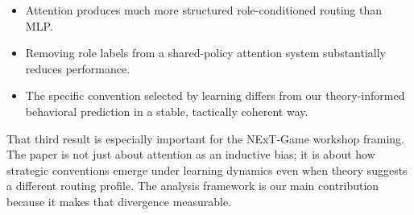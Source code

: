 \begin{itemize}
  \item Attention produces much more structured role-conditioned routing than MLP.
  \item Removing role labels from a shared-policy attention system substantially reduces performance.
  \item The specific convention selected by learning differs from our theory-informed behavioral prediction in a stable, tactically coherent way.
\end{itemize}

That third result is especially important for the NExT-Game workshop framing. The paper is not just about attention as an inductive bias; it is about how strategic conventions emerge under learning dynamics even when theory suggests a different routing profile. The analysis framework is our main contribution because it makes that divergence measurable.
